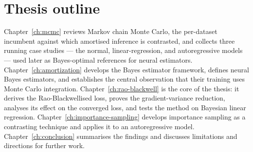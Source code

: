 \section{Thesis outline}
\label{sec:outline}

Chapter~\ref{ch:mcmc} reviews Markov chain Monte Carlo, the
per-dataset incumbent against which amortised inference is contrasted,
and collects three running case studies --- the normal,
linear-regression, and autoregressive models --- used later as Bayes-optimal
references for neural estimators. Chapter~\ref{ch:amortization} develops the Bayes estimator
framework, defines neural Bayes estimators, and establishes the
central observation that their training uses Monte Carlo integration.
Chapter~\ref{ch:rao-blackwell} is the core of the thesis: it derives
the Rao-Blackwellised loss, proves the gradient-variance reduction,
analyses its effect on the converged loss, and tests the method on
Bayesian linear regression. Chapter~\ref{ch:importance-sampling}
develops importance sampling as a contrasting technique and applies it
to an autoregressive model. Chapter~\ref{ch:conclusion} summarises the
findings and discusses limitations and directions for further work.
